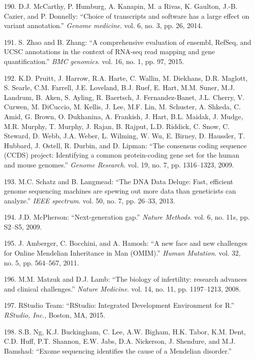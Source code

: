 \documentclass[12pt,a4paper,twoside]{ugathesis}
\theoremstyle{definition}
\theoremstyle{definition}
\theoremstyle{definition}
\theoremstyle{remark}
\begin{document}
\hypertarget{ref-McCarthy2014}{}
190. D.J. McCarthy, P. Humburg, A. Kanapin, M. a Rivas, K. Gaulton,
J.-B. Cazier, and P. Donnelly: ``Choice of transcripts and software has
a large effect on variant annotation.'' \emph{Genome medicine}. vol. 6,
no. 3, pp. 26, 2014.

\hypertarget{ref-Zhao2015}{}
191. S. Zhao and B. Zhang: ``A comprehensive evaluation of ensembl,
RefSeq, and UCSC annotations in the context of RNA-seq read mapping and
gene quantification.'' \emph{BMC genomics}. vol. 16, no. 1, pp. 97,
2015.

\hypertarget{ref-Pruitt2009}{}
192. K.D. Pruitt, J. Harrow, R.A. Harte, C. Wallin, M. Diekhans, D.R.
Maglott, S. Searle, C.M. Farrell, J.E. Loveland, B.J. Ruef, E. Hart,
M.M. Suner, M.J. Landrum, B. Aken, S. Ayling, R. Baertsch, J.
Fernandez-Banet, J.L. Cherry, V. Curwen, M. DiCuccio, M. Kellis, J. Lee,
M.F. Lin, M. Schuster, A. Shkeda, C. Amid, G. Brown, O. Dukhanina, A.
Frankish, J. Hart, B.L. Maidak, J. Mudge, M.R. Murphy, T. Murphy, J.
Rajan, B. Rajput, L.D. Riddick, C. Snow, C. Steward, D. Webb, J.A.
Weber, L. Wilming, W. Wu, E. Birney, D. Haussler, T. Hubbard, J. Ostell,
R. Durbin, and D. Lipman: ``The consensus coding sequence (CCDS)
project: Identifying a common protein-coding gene set for the human and
mouse genomes.'' \emph{Genome Research}. vol. 19, no. 7, pp. 1316--1323,
2009.

\hypertarget{ref-Schatz2013}{}
193. M.C. Schatz and B. Langmead: ``The DNA Data Deluge: Fast, efficient
genome sequencing machines are spewing out more data than geneticists
can analyze.'' \emph{IEEE spectrum}. vol. 50, no. 7, pp. 26--33, 2013.

\hypertarget{ref-McPherson2009}{}
194. J.D. McPherson: ``Next-generation gap.'' \emph{Nature Methods}.
vol. 6, no. 11s, pp. S2--S5, 2009.

\hypertarget{ref-Amberger2011}{}
195. J. Amberger, C. Bocchini, and A. Hamosh: ``A new face and new
challenges for Online Mendelian Inheritance in Man (OMIM).'' \emph{Human
Mutation}. vol. 32, no. 5, pp. 564--567, 2011.

\hypertarget{ref-Matzuk2008}{}
196. M.M. Matzuk and D.J. Lamb: ``The biology of infertility: research
advances and clinical challenges.'' \emph{Nature Medicine}. vol. 14, no.
11, pp. 1197--1213, 2008.

\hypertarget{ref-RStudioTeam2015}{}
197. RStudio Team: ``RStudio: Integrated Development Environment for
R.'' \emph{RStudio, Inc.}, Boston, MA, 2015.

\hypertarget{ref-Ng}{}
198. S.B. Ng, K.J. Buckingham, C. Lee, A.W. Bigham, H.K. Tabor, K.M.
Dent, C.D. Huff, P.T. Shannon, E.W. Jabs, D.A. Nickerson, J. Shendure,
and M.J. Bamshad: ``Exome sequencing identifies the cause of a Mendelian
disorder.''
\end{document}
